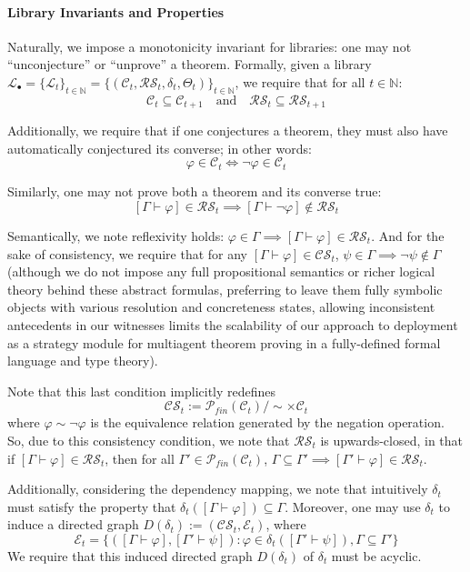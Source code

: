 \documentclass[letterpaper]{article} %
\renewcommand{\phi}{\varphi}
\newcommand{\proves}{\vdash}
\begin{document}
\paragraph{Library Invariants and Properties}

Naturally, we impose a monotonicity invariant for libraries: one may not ``unconjecture'' or ``unprove'' a theorem. Formally, given a library $\mathcal{L}_\bullet = \{\mathcal{L}_t\}_{t \in \mathbb{N}}=\{(\mathcal{C}_t,\mathcal{RS}_t,\delta_t,\Theta_t)\}_{t \in \mathbb{N}}$, we require that for all $t \in \mathbb{N}$:
\[\mathcal{C}_{t} \subseteq \mathcal{C}_{t+1} \quad \text{and} \quad \mathcal{RS}_{t} \subseteq \mathcal{RS}_{t+1}\]

Additionally, we require that if one conjectures a theorem, they must also have automatically conjectured its converse; in other words:
\[\phi \in \mathcal{C}_t \iff \neg\phi \in \mathcal{C}_t\]

Similarly, one may not prove both a theorem and its converse true: 
\[[\Gamma \proves \phi] \in \mathcal{RS}_t \implies [\Gamma \proves \neg \phi] \notin \mathcal{RS}_t\]

Semantically, we note reflexivity holds: $\phi \in \Gamma \implies [\Gamma \proves \phi] \in \mathcal{RS}_t$. And for the sake of consistency, we require that for any $[\Gamma \proves \phi] \in \mathcal{CS}_t$, $\psi \in \Gamma \implies \neg\psi \notin \Gamma$ (although we do not impose any full propositional semantics or richer logical theory behind these abstract formulas, preferring to leave them fully symbolic objects with various resolution and concreteness states, allowing inconsistent antecedents in our witnesses limits the scalability of our approach to deployment as a strategy module for multiagent theorem proving in a fully-defined formal language and type theory). 

Note that this last condition implicitly redefines
\[\mathcal{CS}_t := \mathcal{P}_{fin}(\mathcal{C}_t)/\sim \times \mathcal{C}_t \] where $\phi\sim\neg\phi$ is the equivalence relation generated by the negation operation. So, due to this consistency condition, we note that $\mathcal{RS}_t$ is upwards-closed, in that if $[\Gamma \proves \phi] \in \mathcal{RS}_t$, then for all $\Gamma' \in \mathcal{P}_{fin}(\mathcal{C}_t)$, $\Gamma \subseteq \Gamma' \implies [\Gamma'\proves\phi]\in \mathcal{RS}_t$.

Additionally, considering the dependency mapping, we note that intuitively $\delta_t$ must satisfy the property that $\delta_t([\Gamma \proves \phi]) \subseteq \Gamma$. Moreover, one may use $\delta_t$ to induce a directed graph $D(\delta_t) := (\mathcal{CS}_t,\mathcal{E}_t)$, where 
\[\mathcal{E}_t = \Big\{([\Gamma\proves \phi], [\Gamma' \proves \psi]) : \phi \in \delta_t([\Gamma' \proves \psi]), \Gamma\subseteq \Gamma'\Big\}\]
We require that this induced directed graph $D(\delta_t)$ of $\delta_t$ must be acyclic.
\end{document}
